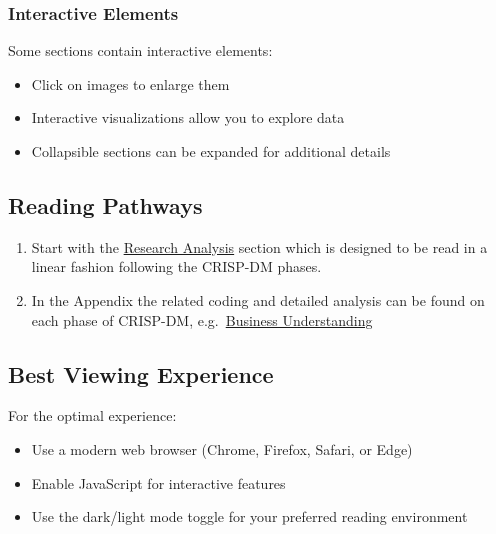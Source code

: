 \documentclass[
  american,
  10,
  a4paper,
]{book}
\providecommand{\tightlist}{%
  \setlength{\itemsep}{0pt}\setlength{\parskip}{0pt}}
\theoremstyle{definition}
\theoremstyle{remark}
\begin{document}
\subsubsection{Interactive Elements}\label{interactive-elements}

Some sections contain interactive elements:

\begin{itemize}
\tightlist
\item
  Click on images to enlarge them\\
\item
  Interactive visualizations allow you to explore data\\
\item
  Collapsible sections can be expanded for additional details
\end{itemize}

\subsection{Reading Pathways}\label{reading-pathways}

\begin{enumerate}
\def\labelenumi{\arabic{enumi}.}
\item
  Start with the \href{nb/00_pythias_advice_rev.html}{Research Analysis}
  section which is designed to be read in a linear fashion following the
  CRISP-DM phases.
\item
  In the Appendix the related coding and detailed analysis can be found
  on each phase of CRISP-DM,
  e.g.~\href{nb/01_business_understanding_rev.html}{Business
  Understanding}
\end{enumerate}

\subsection{Best Viewing Experience}\label{best-viewing-experience}

For the optimal experience:

\begin{itemize}
\tightlist
\item
  Use a modern web browser (Chrome, Firefox, Safari, or Edge)\\
\item
  Enable JavaScript for interactive features\\
\item
  Use the dark/light mode toggle for your preferred reading environment
\end{itemize}
\end{document}
